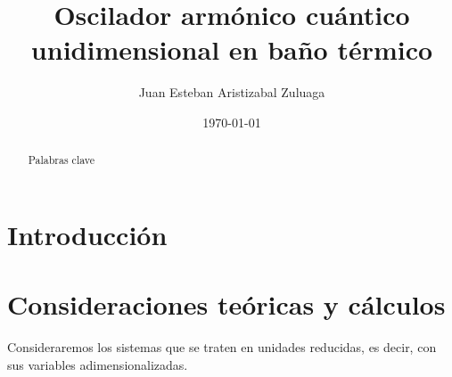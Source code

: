 \documentclass[%
 reprint,
 amsmath,amssymb,
 aps,
 pra,
]{revtex4-2}
\begin{document}

\title{Oscilador armónico cuántico unidimensional en baño térmico}%

\author{Juan Esteban Aristizabal Zuluaga}

\date{\today}%

\begin{abstract}

\begin{description}
\item[Palabras clave]
\end{description}
\end{abstract}

\maketitle


\section{\label{sec:Intro}Introducción}

\section{\label{sec:Teoria}Consideraciones teóricas y cálculos}

Consideraremos los sistemas que se traten en unidades reducidas, es decir, con sus variables adimensionalizadas.
\end{document}
